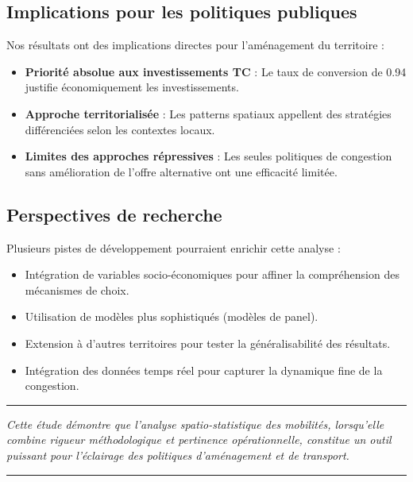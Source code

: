 \documentclass[11pt,a4paper]{article}
\begin{document}
\subsection{Implications pour les politiques publiques}
Nos résultats ont des implications directes pour l'aménagement du territoire :
\begin{itemize}[label=\textbullet]
    \item \textbf{Priorité absolue aux investissements TC} : Le taux de conversion de 0.94 justifie économiquement les investissements.
    \item \textbf{Approche territorialisée} : Les patterns spatiaux appellent des stratégies différenciées selon les contextes locaux.
    \item \textbf{Limites des approches répressives} : Les seules politiques de congestion sans amélioration de l'offre alternative ont une efficacité limitée.
\end{itemize}
\subsection{Perspectives de recherche}
Plusieurs pistes de développement pourraient enrichir cette analyse :
\begin{itemize}[label=\textbullet]
    \item Intégration de variables socio-économiques pour affiner la compréhension des mécanismes de choix.
    \item Utilisation de modèles plus sophistiqués (modèles de panel).
    \item Extension à d'autres territoires pour tester la généralisabilité des résultats.
    \item Intégration des données temps réel pour capturer la dynamique fine de la congestion.
\end{itemize}
\vspace{1.5cm}
\begin{center}
    \begin{minipage}{0.8\textwidth}
        \centering
        \hrule
        \vspace{0.3cm}
        \textit{\small Cette étude démontre que l'analyse spatio-statistique des mobilités, lorsqu'elle combine rigueur méthodologique et pertinence opérationnelle, constitue un outil puissant pour l'éclairage des politiques d'aménagement et de transport.}
        \vspace{0.3cm}
        \hrule
    \end{minipage}
\end{center}
\end{document}
